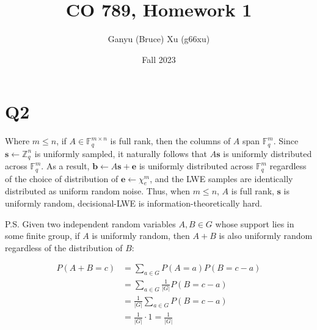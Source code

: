 \documentclass{article}
\title{CO 789, Homework 1}
\author{Ganyu (Bruce) Xu (g66xu)}
\date{Fall 2023}
\begin{document}

\section*{Q2}
Where $m \leq n$, if $A \in \mathbb{F}_q^{m \times n}$ is full rank, then the columns of $A$ span $\mathbb{F}_q^m$. Since $\mathbf{s} \leftarrow \mathbb{Z}_q^n$ is uniformly sampled, it naturally follows that $A\mathbf{s}$ is uniformly distributed across $\mathbb{F}_q^m$. As a result, $\mathbf{b} \leftarrow A\mathbf{s} + \mathbf{e}$ is uniformly distributed across $\mathbb{F}_q^m$ regardless of the choice of distribution of $\mathbf{e} \leftarrow \chi_e^m$, and the LWE samples are identically distributed as uniform random noise. Thus, when $m \leq n$, $A$ is full rank, $\mathbf{s}$ is uniformly random, decisional-LWE is information-theoretically hard.

P.S. Given two independent random variables $A, B \in G$ whose support lies in some finite group, if $A$ is uniformly random, then $A + B$ is also uniformly random regardless of the distribution of $B$:

$$
\begin{aligned}
P(A + B = c)
&= \sum_{a \in G}P(A=a)P(B=c - a) \\
&= \sum_{a \in G}\frac{1}{\vert G \vert}P(B=c - a) \\
&= \frac{1}{\vert G \vert}\sum_{a \in G}P(B=c - a) \\
&= \frac{1}{\vert G \vert} \cdot 1 = \frac{1}{\vert G \vert} \\
\end{aligned}
$$
\end{document}
